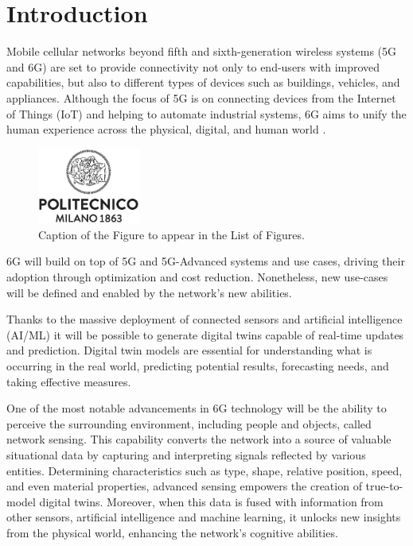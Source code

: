 \chapter{Introduction}
\label{chap_intro}

Mobile cellular networks beyond fifth and sixth-generation wireless systems (5G and 6G) are set to provide connectivity not only to end-users with improved capabilities, but also to different types of devices such as buildings, vehicles, and appliances.
Although the focus of 5G is on connecting devices from the Internet of Things (IoT) and helping to automate industrial systems, 6G aims to unify the human experience across the physical, digital, and human world \cite{6G-explained-NOKIA}.

\begin{figure}[H]
    \centering
    \includegraphics[width=0.3\textwidth]{Images/logo_polimi_scritta.eps}
    \caption{Caption of the Figure to appear in the List of Figures.}
    \label{fig:e}
\end{figure}

6G will build on top of 5G and 5G-Advanced systems and use cases, driving their adoption through optimization and cost reduction. Nonetheless, new use-cases will be defined and enabled by the network's new abilities.

Thanks to the massive deployment of connected sensors and artificial intelligence (AI/ML) it will be possible to generate digital twins capable of real-time updates and prediction.  Digital twin models are essential for understanding what is occurring in the real world, predicting potential results, forecasting needs, and taking effective measures.

One of the most notable advancements in 6G technology will be the ability to perceive the surrounding environment, including people and objects, called network sensing. This capability converts the network into a source of valuable situational data by capturing and interpreting signals reflected by various entities. Determining characteristics such as type, shape, relative position, speed, and even material properties, advanced sensing empowers the creation of true-to-model digital twins. Moreover, when this data is fused with information from other sensors, artificial intelligence and machine learning, it unlocks new insights from the physical world, enhancing the network's cognitive abilities.

